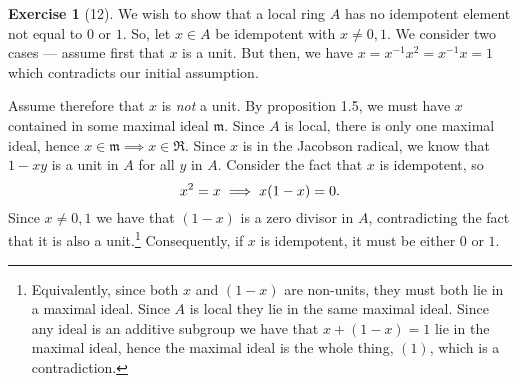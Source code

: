 \documentclass{article}
\theoremstyle{definition}
\newtheorem*{exercise}{Exercise}
\begin{document}
\begin{exercise}[12]
    We wish to show that a local ring $A$ has no idempotent element not
    equal to $0$ or $1$. So, let $x \in A$ be idempotent with $x \neq 0,
    1$. We consider two cases --- assume first that $x$ is a unit. But
    then, we have $x = x^{-1}x^2 = x^{-1}x = 1$ which contradicts our
    initial assumption.

    Assume therefore that $x$ is \emph{not} a unit. By proposition
    1.5, we must have $x$ contained in some maximal ideal
    $\mathfrak{m}$. Since $A$ is local, there is only one maximal
    ideal, hence $x \in \mathfrak{m} \implies x \in \mathfrak{R}$.
    Since $x$ is in the Jacobson radical, we know that $1 - xy$ is a
    unit in $A$ for all $y$ in $A$. Consider the fact that $x$ is
    idempotent, so
    \begin{equation}
        \notag
        x^2 = x \implies x(1 - x) = 0.
    \end{equation}
    Since $x \neq 0, 1$ we have that $(1 - x)$ is a zero divisor in $A$,
    contradicting the fact that it is also a unit.\footnote{Equivalently, since
        both $x$ and $(1 - x)$ are non-units, they must both lie in a maximal
        ideal. Since $A$ is local they lie in the same maximal ideal. Since any
    ideal is an additive subgroup we have that $x + (1 - x) = 1$ lie in the
maximal ideal, hence the maximal ideal is the whole thing, $(1)$, which is a
contradiction.} Consequently, if $x$ is idempotent, it must be either $0$ or
$1$.
\end{exercise}
\end{document}
